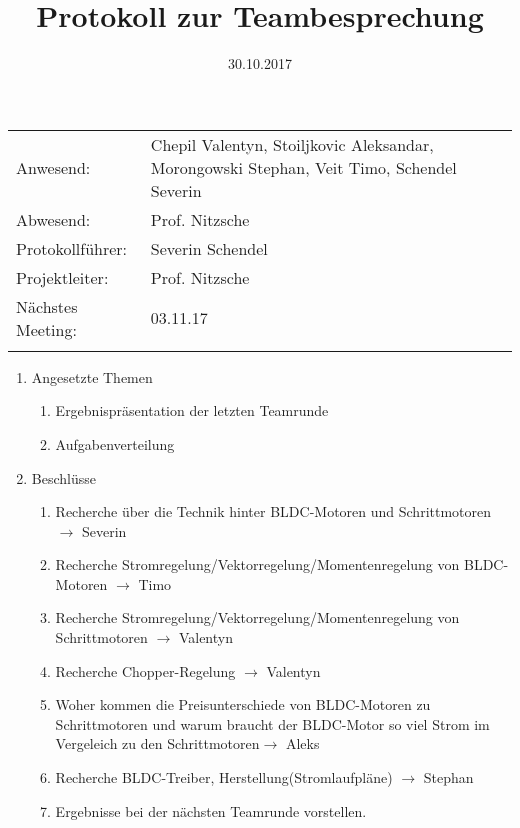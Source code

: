 \documentclass[10pt]{scrartcl}
\title{Protokoll zur Teambesprechung}
\date{30.10.2017}%
\begin{document}
\maketitle
\thispagestyle{empty}

\begin{tabularx}{\textwidth}{lp{9 cm}} 
Anwesend: &  Chepil Valentyn, Stoiljkovic Aleksandar, Morongowski Stephan,  Veit Timo, Schendel Severin\\%
Abwesend: & Prof. Nitzsche \\
Protokollführer: & Severin Schendel \\
Projektleiter: & Prof. Nitzsche\\
Nächstes Meeting: & 03.11.17 \\%
&\\
\end{tabularx}

\begin{enumerate}
	\item Angesetzte Themen
		\begin{enumerate}
			\item Ergebnispräsentation der letzten Teamrunde
			\item Aufgabenverteilung 
		\end{enumerate}
	\item Beschlüsse
		\begin{enumerate}
			\item Recherche über die Technik hinter BLDC-Motoren und Schrittmotoren $\rightarrow$ Severin %
			\item Recherche Stromregelung/Vektorregelung/Momentenregelung von BLDC-Motoren $\rightarrow$ Timo
			\item Recherche Stromregelung/Vektorregelung/Momentenregelung von Schrittmotoren $\rightarrow$ Valentyn
			\item Recherche Chopper-Regelung $\rightarrow$ Valentyn
			\item Woher kommen die Preisunterschiede von BLDC-Motoren zu Schrittmotoren und warum braucht der BLDC-Motor so viel Strom im Vergeleich zu den Schrittmotoren$\rightarrow$ Aleks
			\item Recherche BLDC-Treiber, Herstellung(Stromlaufpläne) $\rightarrow$ Stephan
			\item Ergebnisse bei der nächsten Teamrunde vorstellen.
		\end{enumerate}

	\end{enumerate}
\end{document}
